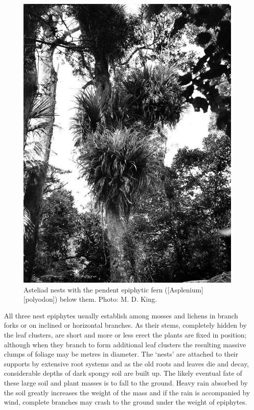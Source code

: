 \begin{figure}[t]
\begin{minipage}[t]{\textwidth}
\begin{minipage}[t]{(\textwidth-\fgap) * \real{0.446}}
			\label{fig:39kahikatea}
		\end{minipage}\hspace{\fgap}%
		\begin{minipage}[t]{(\textwidth-\fgap) * \real{0.554}}
			\centering
			\includegraphics[width=\textwidth]{graphics/figure40asteliad.jpg}
			\caption[Asteliad nests with the pendent epiphytic fern \emph{Asplenium polyodon}]{Asteliad nests with the pendent epiphytic fern  ([Asplenium][polyodon]) below them.
			Photo: M. D. King.}%
			\label{fig:40asteliad}
		\end{minipage}
	\end{minipage}
\end{figure}

All three nest epiphytes usually establish among mosses and lichens in branch forks or on inclined or horizontal branches.
As their stems, completely hidden by the leaf clusters, are short and more or less erect the plants are fixed in position; although when they branch to form additional leaf clusters the resulting massive clumps of foliage may be metres in diameter.
The `nests' are attached to their supports by extensive root systems and as the old roots and leaves die and decay, considerable depths of dark spongy soil are built up.
The likely eventual fate of these large soil and plant masses is to fall to the ground.
Heavy rain absorbed by the soil greatly increases the weight of the mass and if the rain is accompanied by wind, complete branches may crash to the ground under the weight of epiphytes.

